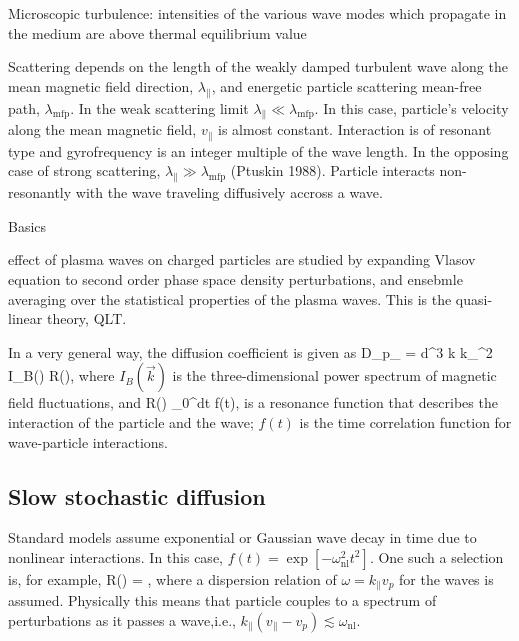 \documentclass{aa}
\begin{document}
Microscopic turbulence:
intensities of the various wave modes which propagate in the medium are above thermal equilibrium value

\citep{Fermi_1949}
\citep{Fermi_1954}
\citep{Lemoine_2019}

Scattering depends on the length of the weakly damped turbulent wave along the mean magnetic field direction, $\lambda_{\parallel}$, and energetic particle scattering mean-free path, $\lambda_{\mathrm{mfp}}$.
In the weak scattering limit $\lambda_{\parallel} \ll \lambda_{\mathrm{mfp}}$.
In this case, particle's velocity along the mean magnetic field, $v_{\parallel}$ is almost constant.
Interaction is of resonant type and gyrofrequency is an integer multiple of the wave length.
In the opposing case of strong scattering, $\lambda_{\parallel} \gg \lambda_{\mathrm{mfp}}$ (Ptuskin 1988).
Particle interacts non-resonantly with the wave traveling diffusively accross a wave.


Basics
\citep{Melrose_1968}
\citep{Schlickeiser_1988}

effect of plasma waves on charged particles are studied by expanding Vlasov equation to second order phase space density perturbations, and ensebmle averaging over the statistical properties of the plasma waves.
This is the quasi-linear theory, QLT.


In a very general way, the diffusion coefficient is given as
\citep{Lynn_2014}
\be
D_{p_{\parallel}} =  
    \int d^3 k k_{\parallel}^2 I_B() R(),
\ee
where $I_B(\vec{k})$ is the three-dimensional power spectrum of magnetic field fluctuations, and 
\be
R() \propto \int_0^\infty dt  f(t),
\ee
is a resonance function that describes the interaction of the particle and the wave;
$f(t)$ is the time correlation function for wave-particle interactions.


\subsection{Slow stochastic diffusion}

Standard models assume exponential or Gaussian wave decay in time due to nonlinear interactions.
In this case, $f(t) = \exp[-\omega_{\mathrm{nl}}^2 t^2]$.
One such a selection is, for example, \citep{Lynn_2012,Lynn_2014}
\be
R() =  \exp{},
\ee
where a dispersion relation of $\omega = k_{\parallel} v_p$ for the waves is assumed.
Physically this means that particle couples to a spectrum of perturbations as it passes a wave,i.e., $k_{\parallel}(v_{\parallel} - v_p) \lesssim \omega_{\mathrm{nl}}$.
\end{document}
